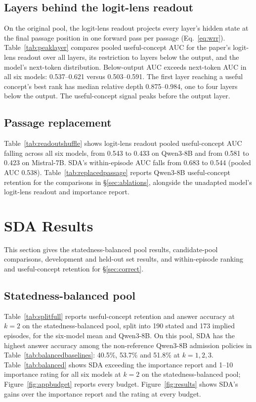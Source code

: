 \subsection{Layers behind the logit-lens readout}\label{app:peaklayer}
On the original pool, the logit-lens readout projects every layer's hidden state at the final passage position in one forward pass per passage (Eq.~\eqref{eq:wrr}). Table~\ref{tab:peaklayer} compares pooled useful-concept AUC for the paper's logit-lens readout over all layers, its restriction to layers below the output, and the model's next-token distribution. Below-output AUC exceeds next-token AUC in all six models: 0.537--0.621 versus 0.503--0.591. The first layer reaching a useful concept's best rank has median relative depth 0.875--0.984, one to four layers below the output. The useful-concept signal peaks before the output layer.



\subsection{Passage replacement}
\label{app:context}
Table~\ref{tab:readoutshuffle} shows logit-lens readout pooled useful-concept AUC falling across all six models, from 0.543 to 0.433 on Qwen3-8B and from 0.581 to 0.423 on Mistral-7B.
SDA's within-episode AUC falls from 0.683 to 0.544 (pooled AUC 0.538).
Table~\ref{tab:replacedpassage} reports Qwen3-8B useful-concept retention for the comparisons in \S\ref{sec:ablations}, alongside the unadapted model's logit-lens readout and importance report.




\section{SDA Results}
\label{app:recall}

This section gives the statedness-balanced pool results, candidate-pool comparisons, development and held-out set results, and within-episode ranking and useful-concept retention for \S\ref{sec:correct}.


\subsection{Statedness-balanced pool}
\label{app:balancedresults}

Table~\ref{tab:splitfull} reports useful-concept retention and answer accuracy at $k=2$ on the statedness-balanced pool, split into 190 stated and 173 implied episodes, for the six-model mean and Qwen3-8B. On this pool, SDA has the highest answer accuracy among the non-reference Qwen3-8B admission policies in Table~\ref{tab:balancedbaselines}: 40.5\%, 53.7\% and 51.8\% at $k=1,2,3$. Table~\ref{tab:balanced} shows SDA exceeding the importance report and 1--10 importance rating for all six models at $k=2$ on the statedness-balanced pool; Figure~\ref{fig:appbudget} reports every budget. Figure~\ref{fig:results} shows SDA's gains over the importance report and the rating at every budget.


